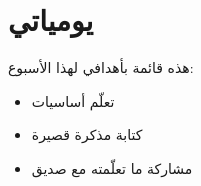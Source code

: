 ﻿\documentclass{article}
\begin{document}
\section{يومياتي}
هذه قائمة بأهدافي لهذا الأسبوع:
\begin{itemize}
\item تعلّم أساسيات 
\item كتابة مذكرة قصيرة
\item مشاركة ما تعلّمته مع صديق
\end{itemize}
\end{document}
